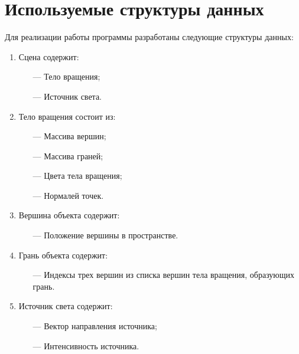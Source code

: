 \section{Используемые структуры данных}
Для реализации работы программы разработаны следующие структуры данных:
\begin{enumerate}
    \item Сцена содержит:
    \begin{itemize}
        \item[---] Тело вращения;
        \item[---] Источник света.
    \end{itemize}
    \item Тело вращения состоит из:
    \begin{itemize}
        \item[---] Массива вершин;
        \item[---] Массива граней;
        \item[---] Цвета тела вращения;
        \item[---] Нормалей точек.
    \end{itemize}
    \item Вершина объекта содержит:
    \begin{itemize}
        \item[---] Положение вершины в пространстве.
    \end{itemize}
    \item Грань объекта содержит: 
    \begin{itemize}
        \item[---] Индексы трех вершин из списка вершин тела вращения, образующих грань.
    \end{itemize}
    \item Источник света содержит:
    \begin{itemize}
        \item[---] Вектор направления источника;
        \item[---] Интенсивность источника.
    \end{itemize}
\end{enumerate}

